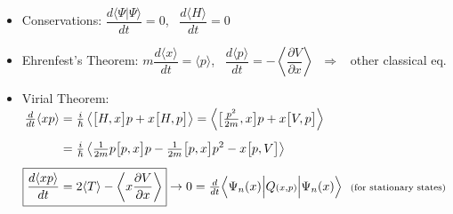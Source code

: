 \documentclass[12pt]{article}
\begin{document}
\begin{itemize}
    \item Conservations: \indent \( \dfrac{d \langle \Psi | \Psi \rangle}{dt} = 0 \), \ 
    \( \dfrac{d \langle H \rangle}{dt} = 0 \)

    \item Ehrenfest's Theorem: \indent 
    \( m \dfrac{d \langle x \rangle}{dt} = \langle p \rangle \), \ 
    \( \dfrac{d \langle p \rangle}{dt} = - \left\langle \dfrac{\partial V}{\partial x} \right\rangle \)
    \( \ \Rightarrow \) \ other classical eq.

    \item Virial Theorem: \indent \( \displaystyle 
    \begin{aligned}[t]
        \tfrac{d}{dt} \langle xp \rangle
            & = \tfrac{i}{\hbar} \left\langle \big[ H,x \big] p + x \big[ H,p \big] \right\rangle 
            = \left\langle \big[ \tfrac{p^2}{2m} , x \big] p + x \big[ V, p \big] \right\rangle 
            \\[5pt]
        & = \tfrac{i}{\hbar} 
            \left\langle 
            \tfrac{1}{2m} p \big[ p, x \big] p 
            - \tfrac{1}{2m} \big[ p, x \big] p^2 
            - x \big[ p, V \big] 
            \right\rangle 
            \\[5pt]
        \Aboxed{ \frac{d \langle xp \rangle}{dt}
            &= 2 \langle T \rangle - 
            \left\langle x \frac{\partial V}{\partial x} \right\rangle }
            \rightarrow 0 = \tfrac{d}{dt} \Big\langle \Psi_n(x) \Big| Q{\scriptstyle(x,p)} \Big| \Psi_n(x) \Big\rangle 
            \ \ \text{\scriptsize (for stationary states) }
    \end{aligned} \)


\end{itemize}
\end{document}
